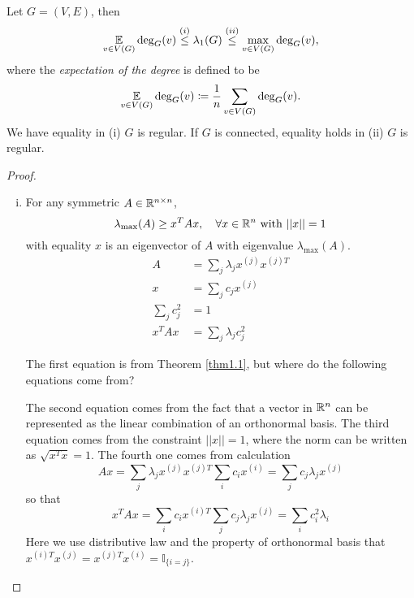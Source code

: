 \begin{proposition}
Let \(G=(V,E)\), then
\[ \operatorname*{\mathbb{E}}_{v\in V(G)} \deg_G(v) \stackrel{(i)}{\leq} \lambda_1(G) \stackrel{(ii)}{\leq} \max_{v\in V(G)}\deg_G(v), \]
where the \emph{expectation of the degree} is defined to be
\[ \operatorname*{\mathbb{E}}_{v\in V(G)} \deg_G(v)\coloneqq\frac{1}{n}\sum_{v\in V(G)}\deg_G(v). \]
We have equality in (i) \iff \(G\) is regular.
If \(G\) is connected, equality holds in (ii) \iff \(G\) is regular.
\end{proposition}
\begin{proof}
\begin{enumerate}[(i)]
\item For any symmetric \(A\in\mathbb{R}^{n\times n}\),
\[ \lambda_{\max}(A)\geq x^T Ax, \quad\forall x\in\mathbb{R}^n \text{ with } ||x||=1 \]
with equality \iff \(x\) is an eigenvector of \(A\) with eigenvalue \(\lambda_{\max}(A)\).
\begin{align*}
A&=\sum_j \lambda_j x^{(j)}x^{(j)T}\\
x&=\sum_j c_j x^{(j)}\\
\sum_j c_j^2&=1\\
x^T Ax&=\sum_j \lambda_j c_j^2
\end{align*}

\begin{question}
The first equation is from Theorem \ref{thm1.1}, but where do the following equations come from?
\end{question}
\begin{answer}
The second equation comes from the fact that a vector in \(\mathbb{R}^n\) can be represented as the linear combination of an orthonormal basis.
The third equation comes from the constraint \(||x||=1\), where the norm can be written as \(\sqrt{x^T x}=1\).
The fourth one comes from calculation
\[ Ax=\sum_j \lambda_j x^{(j)}x^{(j)T} \sum_i c_i x^{(i)}=\sum_j c_j\lambda_j x^{(j)} \]
so that
\[ x^T Ax=\sum_i c_i x^{(i)T}\sum_j c_j\lambda_j x^{(j)}=\sum_i c_i^2\lambda_i  \]
Here we use distributive law and the property of orthonormal basis that \(x^{(i)T}x^{(j)}=x^{(j)T}x^{(i)}=\mathbb{I}_{\{i=j\}}\).
\end{answer}




\end{enumerate}
\end{proof}
